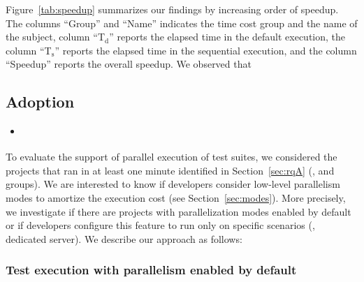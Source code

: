 Figure~\ref{tab:speedup} summarizes our findings by increasing order
of speedup. The columns ``Group'' and ``Name'' indicates the time cost
group and the name of the subject, column ``T$_{\text{d}}$'' reports
the elapsed time in the default execution, the column
``T$_{\text{s}}$'' reports the elapsed time in the sequential
execution, and the column ``Speedup'' reports the overall speedup. We
observed that 

\begin{center}
\end{center}

\subsection{Adoption}
\label{sec:rqC}
\label{sec:rqE}

\begin{itemize}
    \item \emph{\RQC}
\end{itemize}

To evaluate the support of parallel execution of test suites, we
considered the \numMedLong{} projects that ran in at least one minute
identified in Section~\ref{sec:rqA} (\ie, \medg{} and \longg{}
groups). We are interested to know if developers consider low-level
parallelism modes to amortize the execution cost (see
Section~\ref{sec:modes}). More precisely, we investigate if there are
projects with parallelization modes enabled by default or if
developers configure this feature to run only on specific scenarios
(\eg, dedicated server).  We describe our approach as follows:


\subsubsection{Test execution with parallelism enabled by default}
\label{sec:rqC-1}

